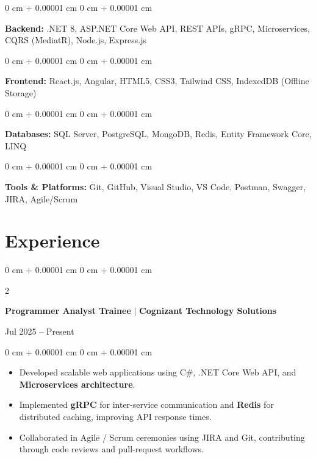 \documentclass[10pt, letterpaper]{article}
\newenvironment{highlights}{
    \begin{itemize}[
        topsep=0.10 cm,
        parsep=0.10 cm,
        partopsep=0pt,
        itemsep=0pt,
        leftmargin=0 cm + 10pt
    ]
}{
    \end{itemize}
} %
\newenvironment{onecolentry}{
    \begin{adjustwidth}{
        0 cm + 0.00001 cm
    }{
        0 cm + 0.00001 cm
    }
}{
    \end{adjustwidth}
} %
\newenvironment{twocolentry}[2][]{
    \onecolentry
    \def\secondColumn{#2}
    \setcolumnwidth{\fill, 4.5 cm}
    \begin{paracol}{2}
}{
    \switchcolumn \raggedleft \secondColumn
    \end{paracol}
    \endonecolentry
} %
\begin{document}
        \begin{onecolentry}
            \textbf{Backend:} .NET 8, ASP.NET Core Web API, REST APIs, gRPC, Microservices, CQRS (MediatR), Node.js, Express.js
        \end{onecolentry}

        \vspace{0.1 cm}

        \begin{onecolentry}
            \textbf{Frontend:} React.js, Angular, HTML5, CSS3, Tailwind CSS, IndexedDB (Offline Storage)
        \end{onecolentry}

        \vspace{0.1 cm}

        \begin{onecolentry}
            \textbf{Databases:} SQL Server, PostgreSQL, MongoDB, Redis, Entity Framework Core, LINQ
        \end{onecolentry}

        \vspace{0.1 cm}

        \begin{onecolentry}
            \textbf{Tools \& Platforms:} Git, GitHub, Visual Studio, VS Code, Postman, Swagger, JIRA, Agile/Scrum
        \end{onecolentry}


    \section{Experience}

        \begin{twocolentry}{
            Jul 2025 -- Present
        }
            \textbf{Programmer Analyst Trainee} $|$ \textbf{Cognizant Technology Solutions}
        \end{twocolentry}
        \vspace{0.10 cm}
        \begin{onecolentry}
            \begin{highlights}
                \item Developed scalable web applications using C\#, .NET Core Web API, and \textbf{Microservices architecture}.
                \item Implemented \textbf{gRPC} for inter-service communication and \textbf{Redis} for distributed caching, improving API response times.
                \item Collaborated in Agile / Scrum ceremonies using JIRA and Git, contributing through code reviews and pull-request workflows.
            \end{highlights}
        \end{onecolentry}
\end{document}
